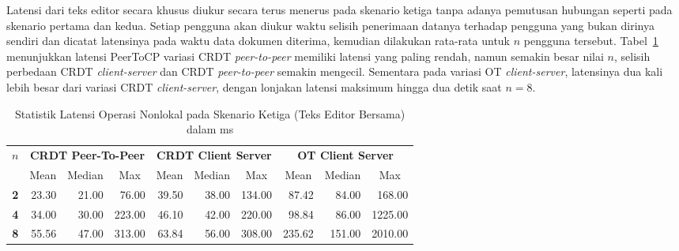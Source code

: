 Latensi dari teks editor secara khusus diukur secara terus menerus pada skenario ketiga tanpa adanya pemutusan hubungan seperti pada skenario pertama dan kedua. Setiap pengguna akan diukur waktu selisih penerimaan datanya terhadap pengguna yang bukan dirinya sendiri dan dicatat latensinya pada waktu data dokumen diterima, kemudian dilakukan rata-rata untuk $n$ pengguna tersebut. Tabel~\ref{tab:latency-3} menunjukkan latensi PeerToCP variasi CRDT \textit{peer-to-peer} memiliki latensi yang paling rendah, namun semakin besar nilai $n$, selisih perbedaan CRDT \textit{client-server} dan CRDT \textit{peer-to-peer} semakin mengecil. Sementara pada variasi OT \textit{client-server}, latensinya dua kali lebih besar dari variasi CRDT \textit{client-server}, dengan lonjakan latensi maksimum hingga dua detik saat $n = 8$.

\begin{table}[H]
 \centering
\begin{tabular}{|c|rrr|rrr|rrr|}
\hline
\multirow{2}{*}{$n$} & \multicolumn{3}{c|}{\textbf{CRDT Peer-To-Peer}} & \multicolumn{3}{c|}{\textbf{CRDT Client Server}} & \multicolumn{3}{c|}{\textbf{OT Client Server}} \\ \cline{2-10}
 & \multicolumn{1}{c|}{Mean} & \multicolumn{1}{c|}{Median} & \multicolumn{1}{c|}{Max} & \multicolumn{1}{c|}{Mean} & \multicolumn{1}{c|}{Median} & \multicolumn{1}{c|}{Max} & \multicolumn{1}{c|}{Mean} & \multicolumn{1}{c|}{Median} & \multicolumn{1}{c|}{Max} \\ \hline
\textbf{2} & \multicolumn{1}{r|}{23.30} & \multicolumn{1}{r|}{21.00} & 76.00 & \multicolumn{1}{r|}{39.50} & \multicolumn{1}{r|}{38.00} & 134.00 & \multicolumn{1}{r|}{87.42} & \multicolumn{1}{r|}{84.00} & 168.00 \\ \hline
\textbf{4} & \multicolumn{1}{r|}{34.00} & \multicolumn{1}{r|}{30.00} & 223.00 & \multicolumn{1}{r|}{46.10} & \multicolumn{1}{r|}{42.00} & 220.00 & \multicolumn{1}{r|}{98.84} & \multicolumn{1}{r|}{86.00} & 1225.00 \\ \hline
\textbf{8} & \multicolumn{1}{r|}{55.56} & \multicolumn{1}{r|}{47.00} & 313.00 & \multicolumn{1}{r|}{63.84} & \multicolumn{1}{r|}{56.00} & 308.00 & \multicolumn{1}{r|}{235.62} & \multicolumn{1}{r|}{151.00} & 2010.00 \\ \hline
\end{tabular}
 \caption{Statistik Latensi Operasi Nonlokal pada Skenario Ketiga (Teks Editor Bersama) dalam ms}
 \label{tab:latency-3}
\end{table}

